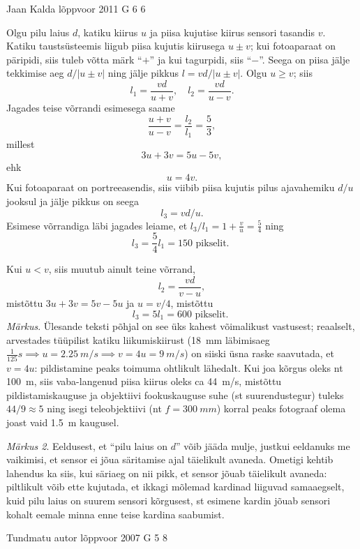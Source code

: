 \documentclass[11pt, twoside]{article}
\begin{document}
{%
{Jaan Kalda} %
{lõppvoor} %
{2011} %
{G 6} %
{6} %
{

\ifSolution
Olgu pilu laius $d$, katiku kiirus $u$ ja piisa kujutise kiirus sensori tasandis $v$. Katiku
taustsüsteemis liigub piisa kujutis kiirusega $u \pm v$; kui fotoaparaat on päripidi, siis tuleb võtta märk \enquote{$+$} ja kui tagurpidi, siis \enquote{$-$}. Seega on piisa jälje tekkimise aeg
$d/|u \pm v|$ ning jälje pikkus $l = vd/|u \pm v|$. Olgu $u \geq v$; siis
\[
l_{1}=\frac{v d}{u+v}, \quad l_{2}=\frac{v d}{u-v}.
\]
Jagades teise võrrandi esimesega saame 
\[
\frac{u+v}{u-v}=\frac{l_{2}}{l_{1}}=\frac{5}{3},
\]
millest
\[
3u+ 3v = 5u-5v,
\]
ehk
\[
u = 4v.
\]
Kui fotoaparaat on portreeasendis, siis viibib piisa kujutis pilus ajavahemiku
$d/u$ jooksul ja jälje pikkus on seega
\[
l_3 = vd/u.
\]
Esimese võrrandiga läbi jagades leiame, et $l_3/l_1 = 1 + \frac{v}{u} = \frac{5}{4}$
ning
\[
l_{3}=\frac{5}{4} l_{1}=150 \text { pikselit. }
\]

Kui $u < v$, siis muutub ainult teine võrrand,
\[
l_2 = \frac{vd}{v - u},
\]
mistõttu $3u + 3v = 5v - 5u$ ja $u = v/4$, mistõttu
\[
l_{3}=5 l_{1}=600 \text { pikselit. }
\]
\emph{Märkus}. Ülesande teksti põhjal on see üks kahest võimalikust vastusest; reaalselt, arvestades tüüpilist katiku liikumiskiirust (\SI{18}{mm} läbimisaeg $\frac{1}{125}\si{s} \implies u = \SI{2,25}{m/s} \implies v = 4u = \SI{9}{m/s}$) on siiski üsna raske saavutada, et $v = 4u$: pildistamine peaks toimuma ohtlikult lähedalt. Kui joa kõrgus oleks nt \SI{100}{m}, siis vaba-langenud piisa
kiirus oleks ca \SI{44}{m/s}, mistõttu pildistamiskauguse ja objektiivi fookuskauguse suhe
(st suurendustegur) tuleks $44/9 \approx 5$ ning isegi teleobjektiivi (nt $f = \SI{300}{mm}$) korral
peaks fotograaf olema joast vaid \SI{1,5}{m} kaugusel.

\emph{Märkus 2}. Eeldusest, et \enquote{pilu laius on $d$} võib jääda mulje, justkui eeldanuks me
vaikimisi, et sensor ei jõua säritamise ajal täielikult avaneda. Ometigi kehtib lahendus
ka siis, kui säriaeg on nii pikk, et sensor jõuab täielikult avaneda: piltlikult võib
ette kujutada, et ikkagi mõlemad kardinad liiguvad samaaegselt, kuid pilu laius on
suurem sensori kõrgusest, st esimene kardin jõuab sensori kohalt eemale minna enne
teise kardina saabumist.
\fi
}

{Tundmatu autor} %
{lõppvoor} %
{2007} %
{G 5} %
{8} %
{

}}
\end{document}
